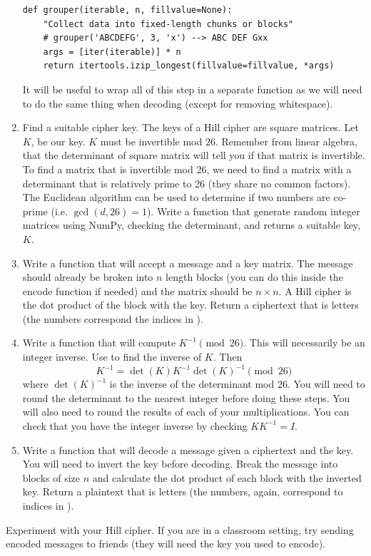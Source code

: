 \begin{problem}
\begin{enumerate}
\begin{lstlisting}
def grouper(iterable, n, fillvalue=None):
    "Collect data into fixed-length chunks or blocks"
    # grouper('ABCDEFG', 3, 'x') --> ABC DEF Gxx
    args = [iter(iterable)] * n
    return itertools.izip_longest(fillvalue=fillvalue, *args)
\end{lstlisting}

It will be useful to wrap all of this step in a separate function as we will 
need to do the same thing when decoding (except for removing whitespace).

\item Find a suitable cipher key.  The keys of a Hill cipher are square 
matrices.  Let $K$, be our key. $K$ must be invertible mod 26.
Remember from linear algebra, that the determinant of square matrix will 
tell you if that matrix is invertible. To find a matrix that is invertible 
mod 26, we need to find a matrix with a determinant that is relatively prime 
to 26 (they share no common factors). The Euclidean algorithm can be used to 
determine if two numbers are co-prime (i.e. $\gcd(d, 26) = 1$). Write a 
function that generate random integer matrices using NumPy, checking the 
determinant, and returns a suitable key, $K$.

\item Write a function that will accept a message and a key matrix.
The message should already be broken into $n$ length blocks (you can do this 
inside the encode function if needed) and the matrix should be $n \times n$.
A Hill cipher is the dot product of the block with the key.  Return a 
ciphertext that is letters (the numbers correspond the indices in 
).

\item Write a function that will compute $K^{-1} \pmod{26}$.  This will 
necessarily be an integer inverse.
Use  to find the inverse of $K$.
Then \[K^{-1} = \det(K)K^{-1}\det(K)^{-1}  \pmod{26}\] where $\det(K)^{-1}$ 
is the inverse of the determinant mod 26.
You will need to round the determinant to the nearest integer before doing 
these steps.  You will also need to round the results of each of your 
multiplications.
You can check that you have the integer inverse by checking $KK^{-1} = I$.

\item Write a function that will decode a message given a ciphertext and the 
key. You will need to invert the key before decoding.  Break the message into 
blocks of size $n$ and calculate the dot product of each block with the 
inverted key. Return a plaintext that is letters (the numbers, again, 
correspond to indices in ).
\end{enumerate}

Experiment with your Hill cipher.  If you are in a classroom setting, try 
sending encoded messages to friends (they will need the key you used to 
encode).
\end{problem}

